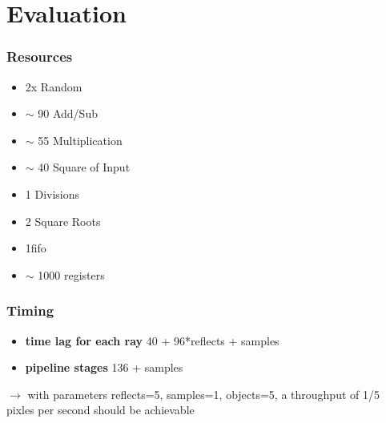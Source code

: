 \documentclass{beamer}
\begin{document}
\section{Evaluation}
\begin{frame}
	\frametitle{Resources}
	\begin{itemize}
		\item 2x Random
		\item $\sim$ 90 Add/Sub
		\item $\sim$ 55 Multiplication
		\item $\sim$ 40 Square of Input
		\item 1 Divisions
		\item 2 Square Roots
		\item 1fifo
		\item $\sim$ 1000 registers
	\end{itemize}
\end{frame}

\begin{frame}
	\frametitle{Timing}
	\begin{itemize}
		
		\item \textbf{time lag for each ray} 40 + 96*reflects + samples
		\item \textbf{pipeline stages} 136 + samples
	\end{itemize}
	$\rightarrow$ with parameters reflects=5, samples=1, objects=5, a throughput of 1/5 pixles per second should be achievable
\end{frame}
\end{document}
